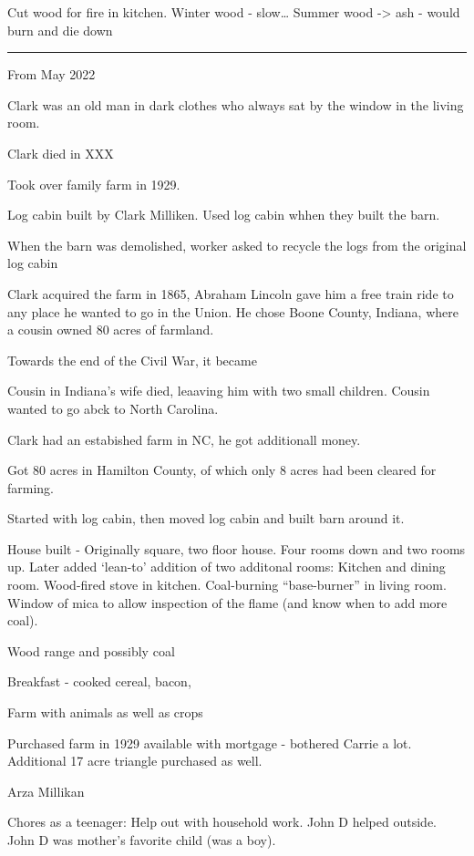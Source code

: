 \documentclass[
]{book}
\begin{document}
Cut wood for fire in kitchen. Winter wood - slow\ldots{}
Summer wood -\textgreater{} ash - would burn and die down

\begin{center}\rule{0.5\linewidth}{0.5pt}\end{center}

From May 2022

Clark was an old man in dark clothes who always sat by the window in the living room.

Clark died in XXX

Took over family farm in 1929.

Log cabin built by Clark Milliken. Used log cabin whhen they built the barn.

When the barn was demolished, worker asked to recycle the logs from the original log cabin

Clark acquired the farm in 1865, Abraham Lincoln gave him a free train ride to any place he wanted to go in the Union. He chose Boone County, Indiana, where a cousin owned 80 acres of farmland.

Towards the end of the Civil War, it became

Cousin in Indiana's wife died, leaaving him with two small children. Cousin wanted to go abck to North Carolina.

Clark had an estabished farm in NC, he got additionall money.

Got 80 acres in Hamilton County, of which only 8 acres had been cleared for farming.

Started with log cabin, then moved log cabin and built barn around it.

House built - Originally square, two floor house. Four rooms down and two rooms up. Later added `lean-to' addition of two additonal rooms: Kitchen and dining room. Wood-fired stove in kitchen. Coal-burning ``base-burner'' in living room. Window of mica to allow inspection of the flame (and know when to add more coal).

Wood range and possibly coal

Breakfast - cooked cereal, bacon,

Farm with animals as well as crops

Purchased farm in 1929 available with mortgage - bothered Carrie a lot. Additional 17 acre triangle purchased as well.

Arza Millikan

Chores as a teenager: Help out with household work. John D helped outside. John D was mother's favorite child (was a boy).
\end{document}
